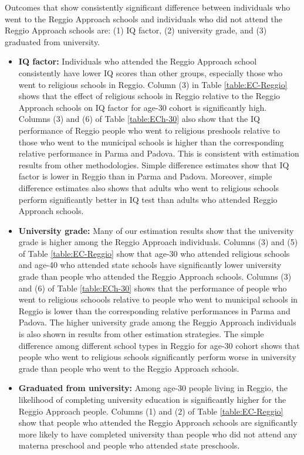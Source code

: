 \documentclass[11pt]{article}
\begin{document}
Outcomes that show consistently significant difference between individuals who went to the Reggio Approach schools and individuals who did not attend the Reggio Approach schools are: (1) IQ factor, (2) university grade, and (3) graduated from university.  
\begin{itemize}
\item \textbf{IQ factor:} Individuals who attended the Reggio Approach school consistently have lower IQ scores than other groups, especially those who went to religious schools in Reggio. Column (3) in Table \ref{table:EC-Reggio} shows that the effect of religious schools in Reggio relative to the Reggio Approach schools on IQ factor for age-30 cohort is significantly high. Columns (3) and (6) of Table \ref{table:ECh-30} also show that the IQ performance of Reggio people who went to religious preshools relative to those who went to the municipal schools is higher than the corresponding relative performance in Parma and Padova. This is consistent with estimation results from other methodologies. Simple difference estimates show that IQ factor is lower in Reggio than in Parma and Padova. Moreover, simple difference estimates also shows that adults who went to religious schools perform significantly better in IQ test than adults who attended Reggio Approach schools.  
\item \textbf{University grade:} Many of our estimation results show that the university grade is higher among the Reggio Approach individuals. Columns (3) and (5) of Table \ref{table:EC-Reggio} show that age-30 who attended religious schools and age-40 who attended state schools have significantly lower university grade than people who attended the Reggio Approach schools. Columns (3) and (6) of Table \ref{table:ECh-30} shows that the performance of people who went to religious schoools relative to people who went to municipal schools in Reggio is lower than the corresponding relative performances in Parma and Padova. The higher university grade among the Reggio Approach individuals is also shown in results from other estimation strategies. The simple difference among different school types in Reggio for age-30 cohort shows that people who went to religious schools significantly perform worse in university grade than people who went to the Reggio Approach schools.
\item \textbf{Graduated from university:} Among age-30 people living in Reggio, the likelihood of completing university education is significantly higher for the Reggio Approach people. Columns (1) and (2) of Table \ref{table:EC-Reggio} show that people who attended the Reggio Approach schools are significantly more likely to have completed university than people who did not attend any materna preschool and people who attended state preschools. 
\end{itemize}
\end{document}
